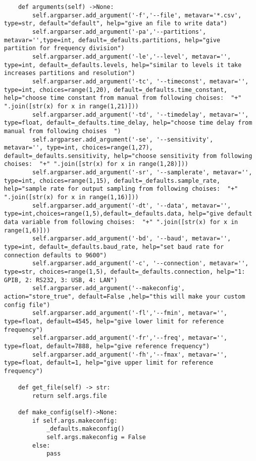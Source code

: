 \begin{verbatim}
    def arguments(self) ->None:
        self.argparser.add_argument('-f','--file', metavar='*.csv', type=str, default="default", help="give an file to write data")
        self.argparser.add_argument('-pa','--partitions', metavar='',type=int, default=_defaults.partitions, help="give partition for frequency division")
        self.argparser.add_argument('-le','--level', metavar='', type=int, default=_defaults.levels, help="similar to levels it take increases partitions and resolution")
        self.argparser.add_argument('-tc', '--timeconst', metavar='', type=int, choices=range(1,20), default=_defaults.time_constant, help="choose time constant from manual from following choises:  "+" ".join([str(x) for x in range(1,21)]))
        self.argparser.add_argument('-td', '--timedelay', metavar='', type=float, default=_defaults.time_delay, help="choose time delay from manual from following choises  ")
        self.argparser.add_argument('-se', '--sensitivity', metavar='', type=int, choices=range(1,27), default=_defaults.sensitivity, help="choose sensitivity from following choises:  "+" ".join([str(x) for x in range(1,28)]))
        self.argparser.add_argument('-sr', '--samplerate', metavar='', type=int, choices=range(1,15), default=_defaults.sample_rate, help="sample rate for output sampling from following choises:  "+" ".join([str(x) for x in range(1,16)]))
        self.argparser.add_argument('-dt', '--data', metavar='', type=int,choices=range(1,5),default=_defaults.data, help="give default data variable from following choises:  "+" ".join([str(x) for x in range(1,6)]))
        self.argparser.add_argument('-bd', '--baud', metavar='', type=int, default=_defaults.baud_rate, help="set baud rate for connection defaults to 9600")
        self.argparser.add_argument('-c', '--connection', metavar='', type=str, choices=range(1,5), default=_defaults.connection, help="1: GPIB, 2: RS232, 3: USB, 4: LAN")
        self.argparser.add_argument('--makeconfig', action="store_true", default=False ,help="this will make your custom config file")
        self.argparser.add_argument('-fl','--fmin', metavar='', type=float, default=4545, help="give lower limit for reference frequency")
        self.argparser.add_argument('-fr','--freq', metavar='', type=float, default=7888, help="give reference frequency")
        self.argparser.add_argument('-fh','--fmax', metavar='', type=float, default=1, help="give upper limit for reference frequency")

    def get_file(self) -> str:
        return self.args.file   

    def make_config(self)->None:
        if self.args.makeconfig:
            _defaults.makeconfig()
            self.args.makeconfig = False
        else:
            pass


\end{verbatim}
